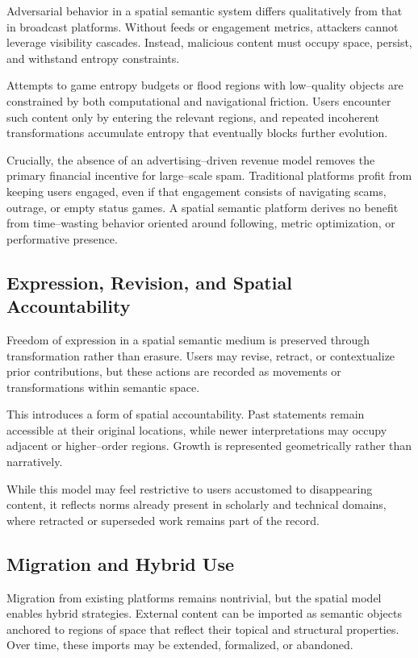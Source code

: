 \documentclass[11pt]{article}
\begin{document}
Adversarial behavior in a spatial semantic system differs qualitatively from that in
broadcast platforms. Without feeds or engagement metrics, attackers cannot leverage
visibility cascades. Instead, malicious content must occupy space, persist, and withstand
entropy constraints.

Attempts to game entropy budgets or flood regions with low--quality objects are constrained
by both computational and navigational friction. Users encounter such content only by
entering the relevant regions, and repeated incoherent transformations accumulate entropy
that eventually blocks further evolution.

Crucially, the absence of an advertising--driven revenue model removes the primary
financial incentive for large--scale spam. Traditional platforms profit from keeping users
engaged, even if that engagement consists of navigating scams, outrage, or empty status
games. A spatial semantic platform derives no benefit from time--wasting behavior oriented
around following, metric optimization, or performative presence.

\subsection{Expression, Revision, and Spatial Accountability}

Freedom of expression in a spatial semantic medium is preserved through transformation
rather than erasure. Users may revise, retract, or contextualize prior contributions, but
these actions are recorded as movements or transformations within semantic space.

This introduces a form of spatial accountability. Past statements remain accessible at
their original locations, while newer interpretations may occupy adjacent or higher--order
regions. Growth is represented geometrically rather than narratively.

While this model may feel restrictive to users accustomed to disappearing content, it
reflects norms already present in scholarly and technical domains, where retracted or
superseded work remains part of the record.

\subsection{Migration and Hybrid Use}

Migration from existing platforms remains nontrivial, but the spatial model enables hybrid
strategies. External content can be imported as semantic objects anchored to regions of
space that reflect their topical and structural properties. Over time, these imports may
be extended, formalized, or abandoned.
\end{document}
